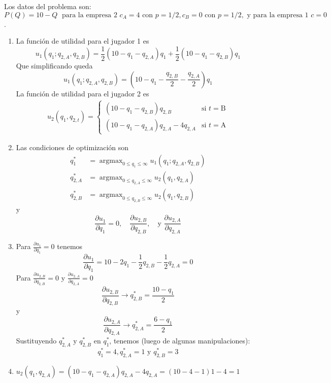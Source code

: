 \documentclass[12pt]{scrartcl} %
\DeclareMathOperator*{\argmax}{argmax}
\begin{document}
\begin{Exercise}[name={Respuesta}]

  Los datos del problema son: $ P(Q) = 10 - Q\; \text{ para la empresa 2 } c_A = 4 \text{ con } p =1/2, c_B = 0  \text{ con } p =1/2, \text{ y para la empresa 1 } c = 0$.

  \begin{enumerate}
    \item La función de utilidad para el jugador 1 es 
    \[u_1(q_1; q_{2,A}, q_{2, B}) = \frac{1}{2}(10 - q_1 - q_{2,A})q_1 + \frac{1}{2}(10 - q_1 - q_{2,B})q_1\]
    Que simplificando queda
    \[u_1(q_1; q_{2,A}, q_{2, B}) = \left( 10 - q_1 - \frac{q_{2,B}}{2}- \frac{q_{2,A}}{2} \right)q_1\]
    La función de utilidad para el jugador 2 es
    \begin{align*}
      u_2(q_1, q_{2,t}) =%
      \begin{cases}
        (10 - q_1 - q_{2,B})q_{2,B} &\text{si } t = \text{B}\\
        (10 - q_1 - q_{2,A})q_{2,A} - 4q_{2,A} &\text{si } t = \text{A}
      \end{cases}
    \end{align*}
  
    \item Las condiciones de optimización son
    \begin{align*}
      q_1^*    & = \argmax_{0\leq q_1 \leq \infty} u_1(q_1; q_{2,A}, q_{2,B}) \\
      q_{2,A}^* & = \argmax_{0\leq q_{2,A} \leq \infty} u_2(q_1, q_{2,A})      \\
      q_{2,B}^* & = \argmax_{0\leq q_{2,B} \leq \infty} u_2(q_1, q_{2,B})
    \end{align*}
    y 
    \[\frac{\partial u_1}{\partial q_1}=0,\quad \frac{\partial u_{2,B}}{\partial q_{2,B}},\quad \text{y } \frac{\partial u_{2,A}}{\partial q_{2,A}} \]
    \item Para $ \frac{\partial u_1}{\partial q_1}=0 $ tenemos
    \[\frac{\partial u_1}{\partial q_1} = 10 - 2q_1 - \frac{1}{2}q_{2,B} - \frac{1}{2}q_{2,A}= 0\]
    Para $\frac{\partial u_{2,B}}{\partial q_{2,B}} = 0$ y $ \frac{\partial u_{2,A}}{\partial q_{2,A}} = 0 $
    \[\frac{\partial u_{2,B}}{\partial q_{2,B}} \longrightarrow q_{2,B}^* = \frac{10-q_1}{2} \]
    y 
    \[\frac{\partial u_{2,A}}{\partial q_{2,A}} \longrightarrow q_{2,A}^* = \frac{6-q_1}{2} \]
    Sustituyendo $  q_{2,A}^* \text{ y }  q_{2,B}^* \text{ en } q_1^*$, tenemos (luego de algunas manipulaciones):
    \[q_1^* = 4, q_{2,A}^* = 1 \text{ y } q_{2,B}^* = 3\]
    \item $ u_2(q_1, q_{2,A}) = (10-q_1-q_{2,A})q_{2,A} - 4q_{2,A} = (10-4-1)1-4=1$
  \end{enumerate}

\end{Exercise}
\end{document}
